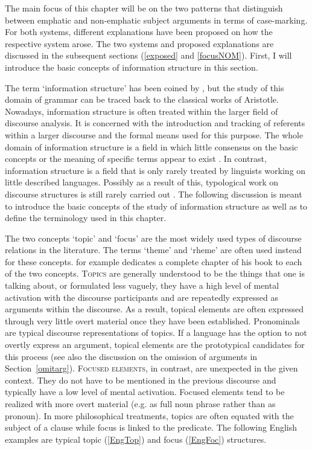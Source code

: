 The main focus of this chapter will be on the two patterns that distinguish between emphatic and non-emphatic subject arguments in terms of case-marking. 
For both systems, different explanations have been proposed on how the respective system arose. 
The two systems and proposed explanations are discussed in the subsequent sections (\ref{exposed} and \ref{focusNOM}). 
First, I will introduce the basic concepts of information structure in this section. 

The term `information structure' has been coined by \citet{Halliday:1967}, but the study of this domain of grammar can be traced back to the classical works of Aristotle. 
Nowadays, information structure is often treated within the larger field of discourse analysis. 
It is concerned with the introduction and tracking of referents within a larger discourse and the formal means used for this purpose. 
The whole domain of information structure is a field in which little consensus on the basic concepts or the meaning of specific terms appear to exist \citep[261--276]{Payne:1997}. %
In contrast, information structure is a field that is only rarely treated by linguists working on little described languages.
Possibly as a result of this, typological work on discourse structures is still rarely carried out \citep{Myhill:2001}.   
The following discussion is meant to introduce the basic concepts of the study of information structure as well as to define the terminology used in this chapter.

The two concepts `topic' and `focus' are the most widely used types of discourse relations in the literature. 
The terms `theme' and `rheme' are often used instead for these concepts.
\citet{Lambrecht:1994} for example dedicates a complete chapter of his book to each of the two concepts. 
\textsc{Topics} are generally understood to be the things that one is talking about, or formulated less vaguely, they have a high level of mental activation with the discourse participants and are repeatedly expressed as arguments within the discourse. 
As a result, topical elements are often expressed through very little overt material once they have been established. 
Pronominals are typical discourse representations of topics. 
If a language has the option to not overtly express an argument, topical elements are the prototypical candidates for this process (see also the discussion on the omission of arguments in Section~\ref{omitarg}). 
\textsc{Focused elements}, in contrast, are unexpected in the given context. 
They do not have to be mentioned in the previous discourse and typically have a low level of mental activation. 
Focused elements tend to be realized with more overt material (e.g. as full noun phrase rather than as pronoun). 
In more philosophical treatments, topics are often equated with the subject of a clause while focus is linked to the predicate.
The following English examples are typical topic (\ref{EngTop}) and focus (\ref{EngFoc}) structures.

